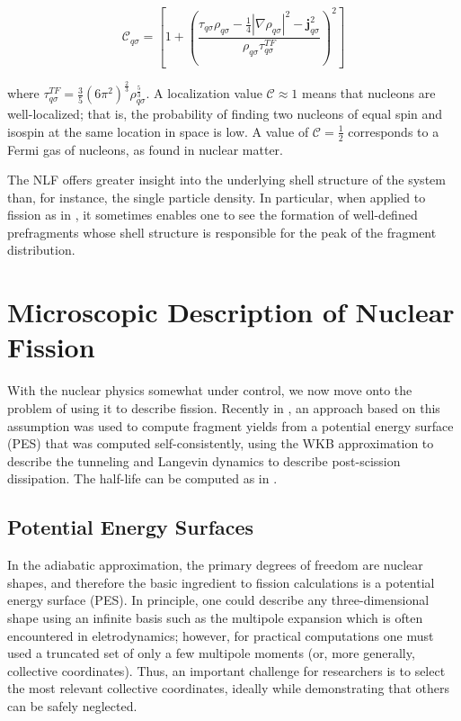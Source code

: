 \begin{equation}
\mathcal{C}_{q\sigma} = \left[1+\left(\frac{\tau_{q\sigma}\rho_{q\sigma}-\frac{1}{4}|\nabla\rho_{q\sigma}|^2-\mathbf{j}^2_{q\sigma}}{\rho_{q\sigma}\tau_{q\sigma}^{TF}}\right)^2\right]
\end{equation}

\noindent where $\tau_{q\sigma}^{TF}=\frac{3}{5}(6\pi^2)^\frac{2}{3}\rho_{q\sigma}^\frac{5}{3}$. A localization value $\mathcal{C} \approx 1$ means that nucleons are well-localized; that is, the probability of finding two nucleons of equal spin and isospin at the same location in space is low. A value of $\mathcal{C}=\frac{1}{2}$ corresponds to a Fermi gas of nucleons, as found in nuclear matter.

The NLF offers greater insight into the underlying shell structure of the system than, for instance, the single particle density. In particular, when applied to fission as in \cite{Sadhukhan2017}, it sometimes enables one to see the formation of well-defined prefragments whose shell structure is responsible for the peak of the fragment distribution.

\section{Microscopic Description of Nuclear Fission}
With the nuclear physics somewhat under control, we now move onto the problem of using it to describe fission. Recently in \cite{Sadhukhan2016}, an approach based on this assumption was used to compute fragment yields from a potential energy surface (PES) that was computed self-consistently, using the WKB approximation to describe the tunneling and Langevin dynamics to describe post-scission dissipation. The half-life can be computed as in \cite{Sadhukhan2013}.

\subsection{Potential Energy Surfaces}
In the adiabatic approximation, the primary degrees of freedom are nuclear shapes, and therefore the basic ingredient to fission calculations is a potential energy surface (PES). In principle, one could describe any three-dimensional shape using an infinite basis such as the multipole expansion which is often encountered in eletrodynamics; however, for practical computations one must used a truncated set of only a few multipole moments (or, more generally, collective coordinates). Thus, an important challenge for researchers is to select the most relevant collective coordinates, ideally while demonstrating that others can be safely neglected.

